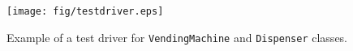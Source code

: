 
\begin{figure}[!ht]
\begin{center}
\texttt{[image: fig/testdriver.eps]}
\caption{\label{fig:drv}Example of a test driver for
\texttt{VendingMachine} and \texttt{Dispenser} classes.}
\end{center}
\end{figure}
